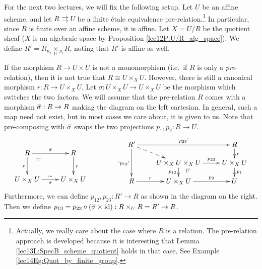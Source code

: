 

 For the next two lectures, we will fix the following setup. Let $U$ be an affine scheme,
 and let $R\rightrightarrows U$ be a finite \'etale equivalence
 pre-relation.\footnote{Actually, we really care about the case where $R$ is a relation.
 The pre-relation approach is developed because it is interesting that Lemma
 \ref{lec13L:SpecB_scheme_quotient} holds in that case. See Example
 \ref{lec14Eg:Quot_by_finite_group}.} In particular, since $R$ is finite over an affine
 scheme, it is affine. Let $X=U/R$ be the quotient sheaf ($X$ is an algebraic space by
 Proposition \ref{lec12P:U/R_alg_space}). We define
 $R'={R{}_{p_2}\!\!\underset{U}{\times}\!{}_{p_1}R}$, noting that $R'$ is affine as well.
 \begin{warning}
   If the morphism $R\to U\times U$ is not a monomorphism (i.e.~if $R$ is only a
   \emph{pre}-relation), then it is not true that $R\cong U\times_X U$. However, there is
   still a canonical morphism $r:R\to U\times_X U$. Let $\sigma:U\times_X U\to U\times_X
   U$ be the morphism which switches the two factors. We will assume that the
   pre-relation $R$ comes with a morphism $\bbar\sigma:R\to R$ making the diagram on the
   left cartesian. In general, such a map need not exist, but in most cases we care
   about, it is given to us. Note that pre-composing with $\bbar\sigma$ swaps the two
   projections $p_1,p_2:R\to U$.
   \[\raisebox{-1pc}{$\xymatrix{
    R \ar[d]_r \ar[r]^{\bbar\sigma} \ar@{}[dr]|(.25)\pb
    & R\ar[d]^r\\
    U\times_X U\ar[r]_\sigma^\sim & U\times_X U
   }$}\qquad\qquad
   \xymatrix@R-1pc{
    R' \ar[dd]_{`p_{12}\text{'}} \ar[rr]^{`p_{23}\text{'}} \ar@{-->}[dr] & & R \ar[d]^r\\
     & U\times_X U\times_X U \ar[r]^<>(.5){p_{23}} \ar[d]_{p_{12}} \ar@{}[dr]_(.2)\pb &
     U\times_X U \ar[d]^{p_1}\\
    R \ar[r]^<>(.5)r & U\times_X U \ar[r]^<>(.5){p_2} & U
   }\]
    Furthermore, we can define $p_{12},p_{23}:R'\to R$ as shown in the diagram on the
   right. Then we define $p_{13} = p_{23}\circ (\bbar\sigma\times\id):R\times_U R=R'\to
   R$. 
 \end{warning}
